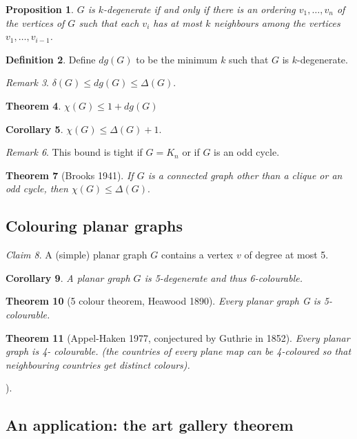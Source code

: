 \documentclass[11pt, fleqn, a4paper, landscape]{article}
\theoremstyle{plain} %
\newtheorem{thm}{Theorem}
\newtheorem{pro}[thm]{Proposition}
\newtheorem{cor}[thm]{Corollary}
\theoremstyle{remark} %
\newtheorem{rem}[thm]{Remark}
\newtheorem{claim}[thm]{Claim}
\theoremstyle{definition} %
\newtheorem{defi}[thm]{Definition}
\begin{document}
\begin{multicols}{3}
\begin{pro}
$G$ is $k$-degenerate if and only if there is an ordering $v_1, \dots , v_n$ of the vertices of $G$ such that each $v_i$ has at most $k$ neighbours among the vertices $v_1, \dots , v_{i-1}$.
\end{pro}

\begin{defi}
Define $dg(G)$ to be the minimum $k$ such that $G$ is $k$-degenerate.
\end{defi}
\begin{rem}
$\delta(G) \le dg(G) \le \Delta(G)$.
\end{rem}

\begin{thm}
$\chi(G) \le 1 + dg(G)$
\end{thm}

\begin{cor}
$\chi(G) \le \Delta(G) + 1.$
\end{cor}

\begin{rem}
This bound is tight if $G = K_n$ or if $G$ is an odd cycle.
\end{rem}

\begin{thm}[Brooks 1941]
If $G$ is a connected graph other than a clique or an odd cycle, then
$\chi(G) \le \Delta(G).$
\end{thm}

\subsection{Colouring planar graphs}
\begin{claim}
A (simple) planar graph $G$ contains a vertex $v$ of degree at most 5.
\end{claim}

\begin{cor}
A planar graph $G$ is 5-degenerate and thus 6-colourable.
\end{cor}
\begin{thm}[5 colour theorem, Heawood 1890]
Every planar graph G is 5-colourable.
\end{thm}

\begin{thm}[Appel-Haken 1977, conjectured by Guthrie in 1852]
Every planar graph is 4-
colourable. (the countries of every plane map can be 4-coloured so that neighbouring countries get
distinct colours).
\end{thm}). 
\addtocounter{thm}{1}
\subsection{An application: the art gallery theorem}


\end{multicols}
\end{document}
